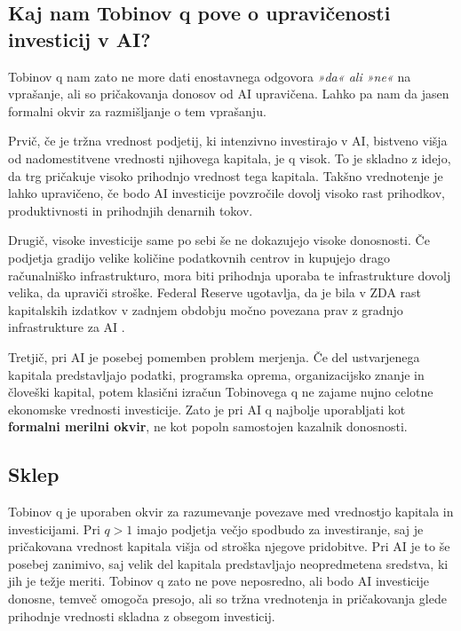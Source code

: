 \documentclass[12pt,a4paper]{article}
\begin{document}

\subsection{Kaj nam Tobinov q pove o upravičenosti investicij v AI?}


Tobinov q nam zato ne more dati enostavnega odgovora \textit{»da« ali »ne«} na vprašanje, 
ali so pričakovanja donosov od AI upravičena. Lahko pa nam da jasen formalni okvir za 
razmišljanje o tem vprašanju.

Prvič, če je tržna vrednost podjetij, ki intenzivno investirajo v AI, bistveno višja od 
nadomestitvene vrednosti njihovega kapitala, je q visok. To je skladno z idejo, da trg 
pričakuje visoko prihodnjo vrednost tega kapitala. Takšno vrednotenje je lahko upravičeno, 
če bodo AI investicije povzročile dovolj visoko rast prihodkov, produktivnosti in prihodnjih 
denarnih tokov.

Drugič, visoke investicije same po sebi še ne dokazujejo visoke donosnosti. Če podjetja 
gradijo velike količine podatkovnih centrov in kupujejo drago računalniško infrastrukturo, 
mora biti prihodnja uporaba te infrastrukture dovolj velika, da upraviči stroške. Federal 
Reserve ugotavlja, da je bila v ZDA rast kapitalskih izdatkov v zadnjem obdobju močno 
povezana prav z gradnjo infrastrukture za AI \citep{FederalReserve2026}.

Tretjič, pri AI je posebej pomemben problem merjenja. Če del ustvarjenega kapitala 
predstavljajo podatki, programska oprema, organizacijsko znanje in človeški kapital, 
potem klasični izračun Tobinovega q ne zajame nujno celotne ekonomske vrednosti investicije. 
Zato je pri AI q najbolje uporabljati kot \textbf{formalni merilni okvir}, ne kot popoln 
samostojen kazalnik donosnosti.


\subsection{Sklep}


Tobinov q je uporaben okvir za razumevanje povezave med vrednostjo kapitala in investicijami. 
Pri \(q>1\) imajo podjetja večjo spodbudo za investiranje, saj je pričakovana vrednost kapitala 
višja od stroška njegove pridobitve. Pri AI je to še posebej zanimivo, saj velik del kapitala 
predstavljajo neopredmetena sredstva, ki jih je težje meriti. Tobinov q zato ne pove neposredno, 
ali bodo AI investicije donosne, temveč omogoča presojo, ali so tržna vrednotenja in 
pričakovanja glede prihodnje vrednosti skladna z obsegom investicij.
\end{document}
